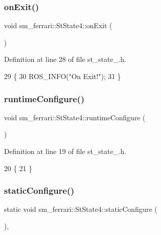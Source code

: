 \subsubsection{\texorpdfstring{on\+Exit()}{onExit()}}
{\footnotesize\ttfamily void sm\+\_\+ferrari\+::\+St\+State4\+::on\+Exit (\begin{DoxyParamCaption}{ }\end{DoxyParamCaption})\hspace{0.3cm}{\ttfamily [inline]}}



Definition at line 28 of file st\+\_\+state\+\_.\+h.


\begin{DoxyCode}
29     \{
30         ROS\_INFO(\textcolor{stringliteral}{"On Exit!"});
31     \}
\end{DoxyCode}
\mbox{\label{structsm__ferrari_1_1StState4_a807a990b1e231105ccff8a3322d9bccc}} 
\subsubsection{\texorpdfstring{runtime\+Configure()}{runtimeConfigure()}}
{\footnotesize\ttfamily void sm\+\_\+ferrari\+::\+St\+State4\+::runtime\+Configure (\begin{DoxyParamCaption}{ }\end{DoxyParamCaption})\hspace{0.3cm}{\ttfamily [inline]}}



Definition at line 19 of file st\+\_\+state\+\_.\+h.


\begin{DoxyCode}
20     \{
21     \}
\end{DoxyCode}
\mbox{\label{structsm__ferrari_1_1StState4_a1b12da24983fb4162bfc1791a91f4fd4}} 
\subsubsection{\texorpdfstring{static\+Configure()}{staticConfigure()}}
{\footnotesize\ttfamily static void sm\+\_\+ferrari\+::\+St\+State4\+::static\+Configure (\begin{DoxyParamCaption}{ }\end{DoxyParamCaption})\hspace{0.3cm}{\ttfamily [inline]}, {\ttfamily [static]}}



